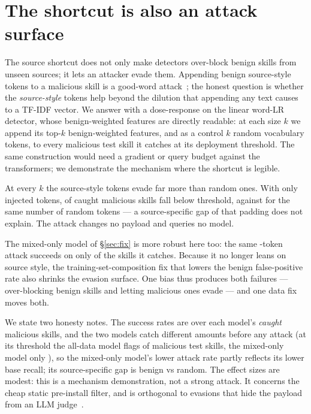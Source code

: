 \section{The shortcut is also an attack surface}
\label{sec:attack}
The source shortcut does not only make detectors over-block benign skills from unseen sources; it lets
an attacker evade them. Appending benign source-style tokens to a malicious skill is a good-word
attack~\cite{lowd2005}; the honest question is whether the \emph{source-style} tokens help beyond the
dilution that appending any text causes to a TF-IDF vector. We answer with a dose-response on the linear
word-LR detector, whose benign-weighted features are directly readable: at each size $k$ we append its
top-$k$ benign-weighted features, and as a control $k$ random vocabulary tokens, to every malicious test
skill it catches at its deployment threshold. The same construction would need a gradient or query budget
against the transformers; we demonstrate the mechanism where the shortcut is legible.

At every $k$ the source-style tokens evade far more than random ones. With only \EvasionK{} injected
tokens, \EvasionAsrAll{} of caught malicious skills fall below threshold, against \EvasionControlAll{}
for the same number of random tokens --- a source-specific gap of \EvasionGapAll{} that padding does
not explain. The attack changes no payload and queries no model.

The mixed-only model of \S\ref{sec:fix} is more robust here too: the same \EvasionK{}-token attack
succeeds on only \EvasionAsrMixed{} of the skills it catches. Because it no longer leans on source
style, the training-set-composition fix that lowers the benign false-positive rate also shrinks the
evasion surface. One bias thus produces both failures --- over-blocking benign skills and letting
malicious ones evade --- and one data fix moves both.

We state two honesty notes. The success rates are over each model's \emph{caught} malicious skills, and
the two models catch different amounts before any attack (at its threshold the all-data model flags
\EvasionBaseRecallAll{} of malicious test skills, the mixed-only model only \EvasionBaseRecallMixed{}), so
the mixed-only model's lower attack rate partly reflects its lower base recall; its source-specific gap
is \EvasionAsrMixed{} benign vs \EvasionControlMixed{} random. The effect sizes are modest: this is a
mechanism demonstration, not a strong attack. It concerns the cheap static pre-install filter, and is
orthogonal to evasions that hide the payload from an LLM judge~\cite{pretext2026,cloakdetonate2026}.
